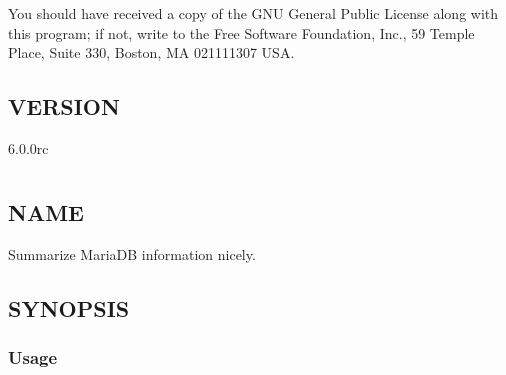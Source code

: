 \documentclass[letterpaper,10pt,english]{sphinxmanual}
\begin{document}
You should have received a copy of the GNU General Public License along with
this program; if not, write to the Free Software Foundation, Inc., 59 Temple
Place, Suite 330, Boston, MA  02111\sphinxhyphen{}1307  USA.


\section{VERSION}
\label{\detokenize{mariadb-archiver:version}}
 6.0.0rc


\chapter{}
\label{\detokenize{mariadb-backup-manager:mariadb-backup-manager}}\label{\detokenize{mariadb-backup-manager::doc}}

\chapter{}
\label{\detokenize{mariadb-database-summary:mariadb-database-summary}}\label{\detokenize{mariadb-database-summary::doc}}

\section{NAME}
\label{\detokenize{mariadb-database-summary:name}}
 \sphinxhyphen{} Summarize MariaDB information nicely.


\section{SYNOPSIS}
\label{\detokenize{mariadb-database-summary:synopsis}}

\subsection{Usage}
\label{\detokenize{mariadb-database-summary:usage}}
\begin{sphinxVerbatim}[commandchars=\\\{\}]
 \PYG{p}{[}\PYG{p}{]}
\end{sphinxVerbatim}
\end{document}
